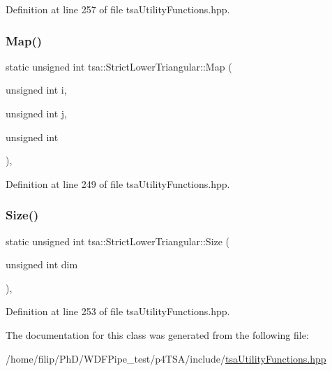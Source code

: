 Definition at line 257 of file tsa\+Utility\+Functions.\+hpp.

\mbox{\label{classtsa_1_1_strict_lower_triangular_a69fb9a803dfb8a4a9228a23ef3250e22}} 
\subsubsection{\texorpdfstring{Map()}{Map()}}
{\footnotesize\ttfamily static unsigned int tsa\+::\+Strict\+Lower\+Triangular\+::\+Map (\begin{DoxyParamCaption}\item[{unsigned int}]{i,  }\item[{unsigned int}]{j,  }\item[{unsigned}]{int }\end{DoxyParamCaption})\hspace{0.3cm}{\ttfamily [inline]}, {\ttfamily [static]}}



Definition at line 249 of file tsa\+Utility\+Functions.\+hpp.

\mbox{\label{classtsa_1_1_strict_lower_triangular_a06a17741f97088e8a67885c618368de5}} 
\subsubsection{\texorpdfstring{Size()}{Size()}}
{\footnotesize\ttfamily static unsigned int tsa\+::\+Strict\+Lower\+Triangular\+::\+Size (\begin{DoxyParamCaption}\item[{unsigned int}]{dim }\end{DoxyParamCaption})\hspace{0.3cm}{\ttfamily [inline]}, {\ttfamily [static]}}



Definition at line 253 of file tsa\+Utility\+Functions.\+hpp.



The documentation for this class was generated from the following file\+:\begin{DoxyCompactItemize}
\item 
/home/filip/\+Ph\+D/\+W\+D\+F\+Pipe\+\_\+test/p4\+T\+S\+A/include/\hyperlink{tsa_utility_functions_8hpp}{tsa\+Utility\+Functions.\+hpp}\end{DoxyCompactItemize}
